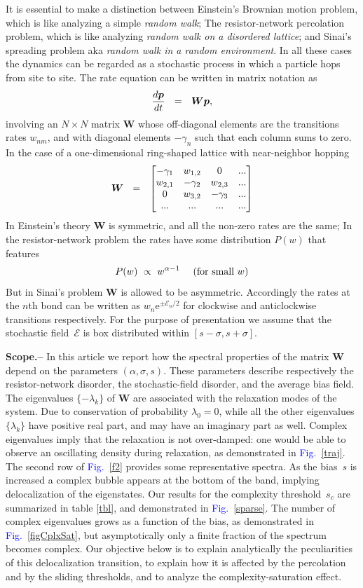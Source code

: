 \documentclass[aps,pre,floats,floatfix,twocolumn]{revtex4}
\newcommand{\amatrix}[1]{\begin{matrix} #1 \end{matrix}}
\newcommand{\eexp}[1]{\mathrm{e}^{#1}}
\newcommand{\be}[1]{\begin{eqnarray}\ifthenelse{#1=-1}{\nonumber}{\ifthenelse{#1=0}{}{\label{e#1}}}}
\newcommand{\eeq}{\end{eqnarray}}
\newcommand{\Fig}[1]{\textcolor{blue}{Fig.}\!\!~\ref{#1}}
\newcommand{\sect}[1]{{\bf #1.-- }}
\begin{document}
It is essential to make a distinction between Einstein's Brownian motion 
problem, which is like analyzing a simple {\em random walk};    
The resistor-network percolation problem, 
which is like analyzing {\em random walk on a disordered lattice}; 
and Sinai's spreading problem aka {\em random walk in a random environment}.  
In all these cases the dynamics can be regarded as a stochastic process 
in which a particle hops from site to site.
The rate equation can be written in matrix notation as 
%
\be{1}
\frac{d\bm{p}}{dt} \ \ = \ \ \bm{W} \bm{p}, 
\eeq
%
involving an $N\times N$ matrix ${\bm{W}}$ whose off-diagonal elements 
are the transitions rates ${w_{nm}}$, 
and with diagonal elements ${-\gamma_n}$ such that each column sums to zero. 
In the case of a one-dimensional ring-shaped lattice with near-neighbor hopping
%
\be{2}
\bm{W} \ \ = \ \ \left[\amatrix{
-\gamma_1   & w_{1,2}   & 0         & ... \\ 
w_{2,1}     & -\gamma_2 & w_{2,3}   & ... \\ 
0           & w_{3,2}   & -\gamma_3 & ... \\
...         & ...       & ...       & ...
}\right]
\eeq 
%
In Einstein's theory $\bm{W}$ is symmetric, 
and all the non-zero rates are the same; 
In the resistor-network problem the rates
have some distribution $P(w)$ that features 
%
\be{4}
P(w) \ \propto \ w^{\alpha-1} \ \ \ \ \text{(for small $w$)}
\eeq
%
But in Sinai's problem $\bm{W}$ is allowed to be asymmetric.
Accordingly the rates at the $n$th bond can be written 
as $w_n\eexp{\pm\mathcal{E}_n/2}$ 
for clockwise and anticlockwise transitions respectively. 
For the purpose of presentation we assume that the stochastic field~$\mathcal{E}$  
is box distributed within ${[s-\sigma,s+\sigma]}$. 


\sect{Scope} 
In this article we report how the spectral properties of the matrix $\bm{W}$ 
depend on the parameters $(\alpha,\sigma,s)$. These parameters
describe respectively the resistor-network disorder, 
the stochastic-field disorder, and the average bias field.    
The eigenvalues $\{-\lambda_k\}$ of $\bm{W}$ are associated 
with the relaxation modes of the system. 
Due to conservation of probability ${\lambda_0=0}$, 
while all the other eigenvalues ${\{\lambda_k\}}$ have positive 
real part, and may have an imaginary part as well. 
Complex eigenvalues imply that the relaxation is not over-damped: 
one would be able to observe an oscillating density during relaxation, 
as demonstrated in \Fig{traj}.    
%
The second row of \Fig{f2} provides some representative spectra.
As the bias~$s$ is increased a complex bubble appears at the bottom 
of the band, implying delocalization of the eigenstates.   
Our results for the complexity threshold~$s_c$ are summarized 
in table \ref{tbl}, and demonstrated in \Fig{sparse}. 
The number of complex eigenvalues grows as a function 
of the bias, as demonstrated in \Fig{figCplxSat},  
but asymptotically only a finite fraction of the spectrum becomes complex. 
%
Our objective below is to explain analytically the 
peculiarities of this delocalization transition, 
to explain how it is affected by the percolation and by the sliding thresholds, 
and to analyze the complexity-saturation effect.  
\end{document}
